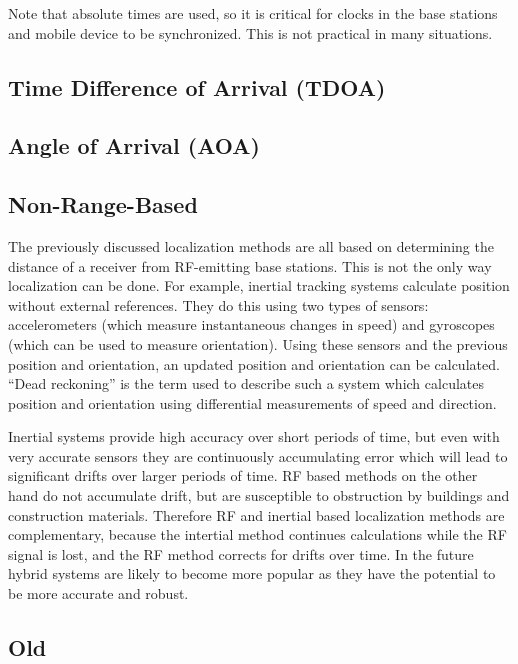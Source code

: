 Note that absolute times are used, so it is critical for clocks in the base stations and mobile device to be synchronized. This is not practical in many situations.

\subsection{Time Difference of Arrival (TDOA)}

\subsection{Angle of Arrival (AOA)}

\subsection{Non-Range-Based}

The previously discussed localization methods are all based on determining the distance of a receiver from RF-emitting base stations. This is not the only way localization can be done. For example, inertial tracking systems calculate position without external references. They do this using two types of sensors: accelerometers (which measure instantaneous changes in speed) and gyroscopes (which can be used to measure orientation). Using these sensors and the previous position and orientation, an updated position and orientation can be calculated. ``Dead reckoning'' is the term used to describe such a system which calculates position and orientation using differential measurements of speed and direction.

Inertial systems provide high accuracy over short periods of time, but even with very accurate sensors they are continuously accumulating error which will lead to significant drifts over larger periods of time. RF based methods on the other hand do not accumulate drift, but are susceptible to obstruction by buildings and construction materials. Therefore RF and inertial based localization methods are complementary, because the intertial method continues calculations while the RF signal is lost, and the RF method corrects for drifts over time. In the future hybrid systems are likely to become more popular as they have the potential to be more accurate and robust.

\subsection{Old}

